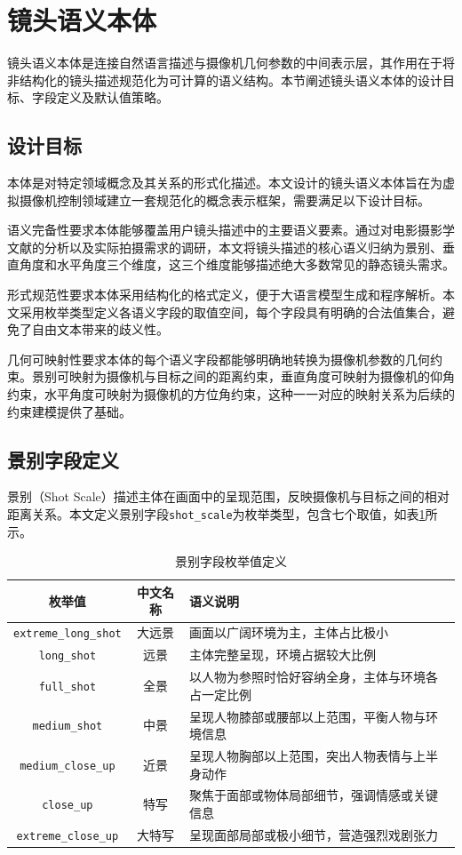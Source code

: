 \section{镜头语义本体}

镜头语义本体是连接自然语言描述与摄像机几何参数的中间表示层，其作用在于将非结构化的镜头描述规范化为可计算的语义结构。本节阐述镜头语义本体的设计目标、字段定义及默认值策略。

\subsection{设计目标}

本体是对特定领域概念及其关系的形式化描述\cite{staab2010handbook}。本文设计的镜头语义本体旨在为虚拟摄像机控制领域建立一套规范化的概念表示框架，需要满足以下设计目标。

语义完备性要求本体能够覆盖用户镜头描述中的主要语义要素。通过对电影摄影学文献的分析\cite{arijon1976grammar,mascelli1965five}以及实际拍摄需求的调研，本文将镜头描述的核心语义归纳为景别、垂直角度和水平角度三个维度，这三个维度能够描述绝大多数常见的静态镜头需求。

形式规范性要求本体采用结构化的格式定义，便于大语言模型生成和程序解析。本文采用枚举类型定义各语义字段的取值空间，每个字段具有明确的合法值集合，避免了自由文本带来的歧义性。

几何可映射性要求本体的每个语义字段都能够明确地转换为摄像机参数的几何约束。景别可映射为摄像机与目标之间的距离约束，垂直角度可映射为摄像机的仰角约束，水平角度可映射为摄像机的方位角约束，这种一一对应的映射关系为后续的约束建模提供了基础。

\subsection{景别字段定义}

景别（Shot Scale）描述主体在画面中的呈现范围，反映摄像机与目标之间的相对距离关系\cite{rao2020unified}。本文定义景别字段\texttt{shot\_scale}为枚举类型，包含七个取值，如表\ref{tab:shot_scale_enum}所示。

\begin{table}[htbp]
\centering
\caption{景别字段枚举值定义}
\label{tab:shot_scale_enum}
\begin{tabular}{ccp{8cm}}
\toprule
枚举值 & 中文名称 & 语义说明 \\
\midrule
\texttt{extreme\_long\_shot} & 大远景 & 画面以广阔环境为主，主体占比极小\\
\texttt{long\_shot} & 远景 & 主体完整呈现，环境占据较大比例\\
\texttt{full\_shot} & 全景 & 以人物为参照时恰好容纳全身，主体与环境各占一定比例 \\
\texttt{medium\_shot} & 中景 & 呈现人物膝部或腰部以上范围，平衡人物与环境信息 \\
\texttt{medium\_close\_up} & 近景 & 呈现人物胸部以上范围，突出人物表情与上半身动作 \\
\texttt{close\_up} & 特写 & 聚焦于面部或物体局部细节，强调情感或关键信息 \\
\texttt{extreme\_close\_up} & 大特写 & 呈现面部局部或极小细节，营造强烈戏剧张力 \\
\bottomrule
\end{tabular}
\end{table}

